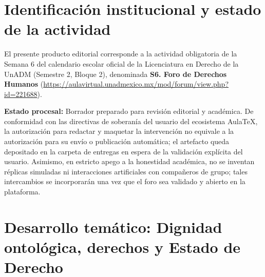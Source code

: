 \documentclass[spanish,letterpaper,oneside]{article}
\begin{document}
\section{Identificación institucional y estado de la actividad}
\hypertarget{cuerpo-inicio}{}
El presente producto editorial corresponde a la actividad obligatoria de la Semana 6 del calendario escolar oficial de la Licenciatura en Derecho de la UnADM (Semestre 2, Bloque 2), denominada \textbf{S6. Foro de Derechos Humanos} (\url{https://aulavirtual.unadmexico.mx/mod/forum/view.php?id=221688}).

\textbf{Estado procesal:} Borrador preparado para revisión editorial y académica. De conformidad con las directivas de soberanía del usuario del ecosistema AulaTeX, la autorización para redactar y maquetar la intervención no equivale a la autorización para su envío o publicación automática; el artefacto queda depositado en la carpeta de entregas en espera de la validación explícita del usuario. Asimismo, en estricto apego a la honestidad académica, no se inventan réplicas simuladas ni interacciones artificiales con compañeros de grupo; tales intercambios se incorporarán una vez que el foro sea validado y abierto en la plataforma.

\section{Desarrollo temático: Dignidad ontológica, derechos y Estado de Derecho}
\end{document}
